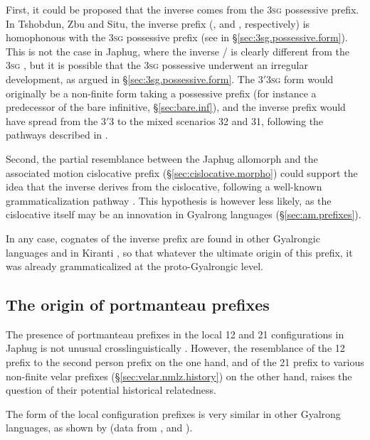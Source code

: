First, it could be proposed that the inverse comes from the \textsc{3sg} possessive prefix. In Tshobdun, Zbu and Situ, the inverse prefix (,  and , respectively) is homophonous with the \textsc{3sg} possessive prefix (see  in §\ref{sec:3sg.possessive.form}). This is not the case in Japhug, where the inverse  /  is clearly different from the \textsc{3sg} , but it is possible that the \textsc{3sg} possessive underwent an irregular development, as argued in §\ref{sec:3sg.possessive.form}. The 3$'$\fl{}3\textsc{sg} form would originally be a non-finite form taking a possessive prefix (for instance a predecessor of the bare infinitive, §\ref{sec:bare.inf}), and the inverse prefix would have spread from the 3$'$\fl{}3 to the mixed scenarios 3\fl{}2 and 3\fl{}1, following the pathways described in \citealt{jacques18directionality}.

Second, the partial resemblance between the Japhug allomorph  and the associated motion cislocative  prefix (§\ref{sec:cislocative.morpho}) could support the idea that the inverse derives from the cislocative, following a well-known grammaticalization pathway \citep{jacques14inverse}. This hypothesis is however less likely, as the cislocative itself may be an innovation in Gyalrong languages (§\ref{sec:am.prefixes}).
 
In any case, cognates of the inverse prefix are found in other Gyalrongic languages \citep{lai15person} and in Kiranti \citep{jacques12agreement}, so that whatever the ultimate origin of this prefix, it was already grammaticalized at the proto-Gyalrongic level.

\subsection{The origin of portmanteau prefixes} \label{sec:portmanteau.prefixes.history}
The presence of portmanteau prefixes in the local 1\fl{}2 and 2\fl{}1 configurations in Japhug is not unusual crosslinguistically \citep{heath98skewing}. However, the resemblance of the 1\fl{}2 prefix  to the second person  prefix on the one hand, and of the 2\fl{}1 prefix  to various non-finite velar prefixes (§\ref{sec:velar.nmlz.history}) on the other hand, raises the question of their potential historical relatedness. 

The form of the local configuration prefixes is very similar in other Gyalrong languages, as shown by  (data from \citealt[218]{linxr93jiarong}, \citealt{jackson02rentongdengdi} and \citealt{gongxun14agreement}). 

